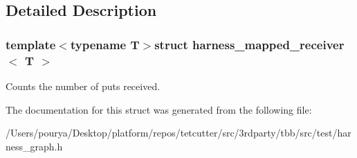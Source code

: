 \subsection{Detailed Description}
\subsubsection*{template$<$typename T$>$struct harness\+\_\+mapped\+\_\+receiver$<$ T $>$}

Counts the number of puts received. 

The documentation for this struct was generated from the following file\+:\begin{DoxyCompactItemize}
\item 
/\+Users/pourya/\+Desktop/platform/repos/tetcutter/src/3rdparty/tbb/src/test/harness\+\_\+graph.\+h\end{DoxyCompactItemize}
